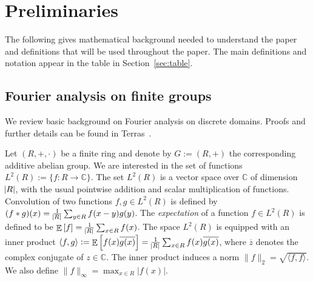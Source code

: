 \documentclass[11pt]{article}
\theoremstyle{definition}
\newcommand{\Z}{\mathbb{Z}}
\newcommand{\C}{\mathbb{C}}
\DeclareMathOperator*{\E}{\mathbb{E}}
\begin{document}


\section{Preliminaries} \label{sec:basics}

The following gives mathematical background needed to understand the paper and definitions that will be used throughout the paper. The main definitions and notation appear in the table in Section~\ref{sec:table}.

\subsection{Fourier analysis on finite groups}

We review basic background on Fourier analysis on discrete domains. Proofs and further details can be found in Terras~\cite{Terras}.

Let $(R, +, \cdot)$ be a finite ring and denote by $G:=(R,+)$ the corresponding additive abelian group. We are interested in the set of functions $L^2(R) := \{ f:R \rightarrow \C \}$. The set $L^2(R)$ is a vector space over $\C$ of dimension $\abs{R}$, with the usual pointwise addition and scalar multiplication of functions.
Convolution of two functions $f, g\in L^2(R)$ is defined by $(f * g)(x) = \frac{1}{\abs{R}}\sum_{y\in R}f(x-y)g(y)$.
The \emph{expectation} of a function $f \in L^2(R)$ is defined to be $\E\left[f\right] = \frac{1}{\abs{R}} \sum_{x \in R} f(x)$.
The space $L^2(R)$ is equipped with an inner product $\langle f, g \rangle := \E\left[ f(x) \overline{g(x)} \right] = \frac{1}{\abs{R}} \sum_{x \in R} f(x) \overline{g(x)}$, where $\overline{z}$ denotes the complex conjugate of $z\in \C$. The inner product induces a norm $\|f\|_2 = \sqrt{\langle f, f\rangle}$.
We also define $\| f \|_\infty = \max_{x \in R} |f(x)|$.
\end{document}
